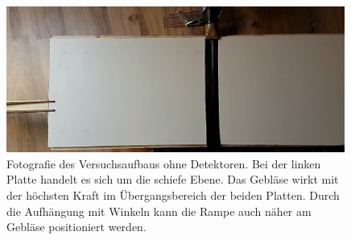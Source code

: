 \begin{figure}[htbp]
\vspace*{0.2cm}
\centering
 \includegraphics[width=0.99\textwidth]{images/Aufbau.png}
  \caption[Versuchsaufbau ohne Detektoren]{Fotografie des Versuchsaufbaus ohne Detektoren. Bei der linken Platte handelt es sich um die schiefe Ebene. Das Gebläse wirkt mit der höchsten Kraft im Übergangsbereich der beiden Platten. Durch die Aufhängung mit Winkeln kann die Rampe auch näher am Gebläse positioniert werden.}
  \label{fig:aufbau1}
  \vspace{-0pt}
\end{figure}